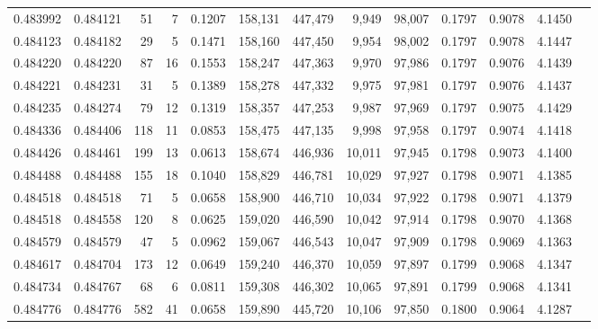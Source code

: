 \begin{tabular}{rrrrrrrrrrrrr}
0.483992 & 0.484121 &    51 &     7 &                                     0.1207 & 158,131 & 447,479 &   9,949 &  98,007 & 0.1797 & 0.9078 & 4.1450 \\
0.484123 & 0.484182 &    29 &     5 &                                     0.1471 & 158,160 & 447,450 &   9,954 &  98,002 & 0.1797 & 0.9078 & 4.1447 \\
0.484220 & 0.484220 &    87 &    16 &                                     0.1553 & 158,247 & 447,363 &   9,970 &  97,986 & 0.1797 & 0.9076 & 4.1439 \\
0.484221 & 0.484231 &    31 &     5 &                                     0.1389 & 158,278 & 447,332 &   9,975 &  97,981 & 0.1797 & 0.9076 & 4.1437 \\
0.484235 & 0.484274 &    79 &    12 &                                     0.1319 & 158,357 & 447,253 &   9,987 &  97,969 & 0.1797 & 0.9075 & 4.1429 \\
0.484336 & 0.484406 &   118 &    11 &                                     0.0853 & 158,475 & 447,135 &   9,998 &  97,958 & 0.1797 & 0.9074 & 4.1418 \\
0.484426 & 0.484461 &   199 &    13 &                                     0.0613 & 158,674 & 446,936 &  10,011 &  97,945 & 0.1798 & 0.9073 & 4.1400 \\
0.484488 & 0.484488 &   155 &    18 &                                     0.1040 & 158,829 & 446,781 &  10,029 &  97,927 & 0.1798 & 0.9071 & 4.1385 \\
0.484518 & 0.484518 &    71 &     5 &                                     0.0658 & 158,900 & 446,710 &  10,034 &  97,922 & 0.1798 & 0.9071 & 4.1379 \\
0.484518 & 0.484558 &   120 &     8 &                                     0.0625 & 159,020 & 446,590 &  10,042 &  97,914 & 0.1798 & 0.9070 & 4.1368 \\
0.484579 & 0.484579 &    47 &     5 &                                     0.0962 & 159,067 & 446,543 &  10,047 &  97,909 & 0.1798 & 0.9069 & 4.1363 \\
0.484617 & 0.484704 &   173 &    12 &                                     0.0649 & 159,240 & 446,370 &  10,059 &  97,897 & 0.1799 & 0.9068 & 4.1347 \\
0.484734 & 0.484767 &    68 &     6 &                                     0.0811 & 159,308 & 446,302 &  10,065 &  97,891 & 0.1799 & 0.9068 & 4.1341 \\
0.484776 & 0.484776 &   582 &    41 &                                     0.0658 & 159,890 & 445,720 &  10,106 &  97,850 & 0.1800 & 0.9064 & 4.1287 \\

\end{tabular}
